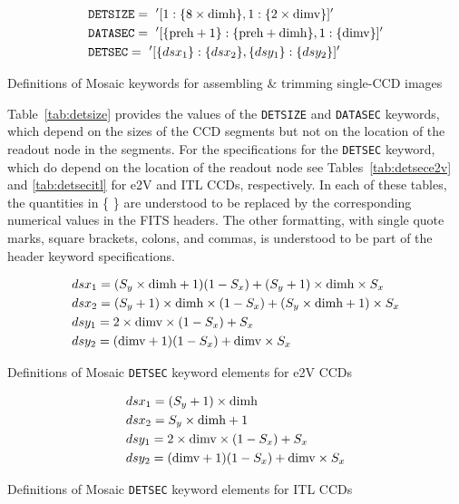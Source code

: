 \documentclass{article}[12pt]
\begin{document}
{\begin{table}
\begin{align*}
& {\tt DETSIZE} =~'[1: \{8 \times {\rm dimh}\}, 1: \{2 \times {\rm dimv}\}]' \\
& {\tt DATASEC} =~'[ \{{\rm preh} + 1\} : \{{\rm preh} + {\rm dimh}\}, 1 :  \{{\rm dimv}\}]' \\
& {\tt DETSEC} =~'[ \{dsx_1\} : \{dsx_2\}, \{dsy_1\}: \{dsy_2\}]' \\
\end{align*}
\caption{Definitions of Mosaic keywords for assembling \& trimming single-CCD images\label{tab:detsize}}
\end{table}

Table~\ref{tab:detsize} provides the values of the {\tt DETSIZE} and {\tt DATASEC} keywords, which depend on the sizes of the CCD segments but not on the location of the readout node in the segments.  For the specifications for the {\tt DETSEC} keyword, which do depend on the location of the readout node see Tables~\ref{tab:detsece2v} and \ref{tab:detsecitl} for e2V and ITL CCDs, respectively.  In each of these tables, the quantities in \{ \} are understood to be replaced by the corresponding numerical values in the FITS headers.  The other formatting, with single quote marks, square brackets, colons, and commas, is understood to be part of the header keyword specifications.

\begin{table}
\begin{align*}
& dsx_1 = (S_y \times {\rm dimh} + 1)(1 - S_x) + (S_y + 1) \times {\rm dimh} \times S_x  \\
& dsx_2 = (S_y +1)  \times {\rm dimh} \times (1 - S_x) + (S_y \times {\rm dimh} + 1) \times S_x \\
& dsy_1 = 2 \times {\rm dimv} \times (1 - S_x) +  S_x \\
& dsy_2 = ({\rm dimv} + 1)(1 - S_x) + {\rm dimv}  \times S_x \\ 
\end{align*}
\caption{Definitions of Mosaic {\tt DETSEC} keyword elements for e2V CCDs\label{tab:detsece2v}}
\end{table}

\begin{table}
\begin{align*}
& dsx_1 = (S_y +1) \times {\rm dimh}  \\
& dsx_2 = S_y \times {\rm dimh} + 1 \\
& dsy_1 = 2 \times {\rm dimv} \times (1 - S_x) +  S_x \\
& dsy_2 = ({\rm dimv} + 1)(1 - S_x) + {\rm dimv}  \times S_x \\ 
\end{align*}
\caption{Definitions of Mosaic {\tt DETSEC} keyword elements for ITL CCDs\label{tab:detsecitl}}
\end{table}

}
\end{document}
